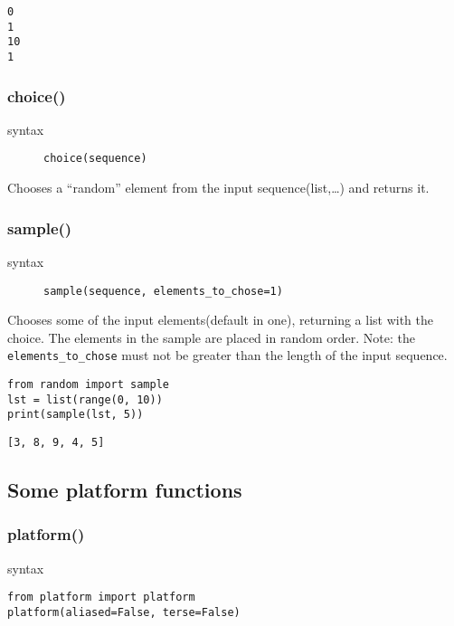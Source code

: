 \documentclass[11pt]{article}
\begin{document}
\begin{verbatim}
0
1
10
1
\end{verbatim}

\subsubsection{choice()}
\label{sec:org2fa9c0e}
\begin{description}
\item[{syntax}] \texttt{choice(sequence)}
\end{description}
Chooses a “random” element from the input sequence(list,\ldots{}) and
returns it.
\subsubsection{sample()}
\label{sec:orgc7cfa40}
\begin{description}
\item[{syntax}] \texttt{sample(sequence, elements\_to\_chose=1)}
\end{description}
Chooses some of the input elements(default in one), returning a list with the
choice. The elements in the sample are placed in random order. Note:
the \texttt{elements\_to\_chose} must not be greater than the length of the input
sequence.


\begin{verbatim}
from random import sample
lst = list(range(0, 10))
print(sample(lst, 5))
\end{verbatim}

\begin{verbatim}
[3, 8, 9, 4, 5]
\end{verbatim}


\newpage

\subsection{Some platform functions}
\label{sec:orgb868094}
\subsubsection{platform()}
\label{sec:org2f8bc53}
\begin{description}
\item[{syntax}] 
\end{description}
\begin{verbatim}
from platform import platform
platform(aliased=False, terse=False)
\end{verbatim}
\end{document}
